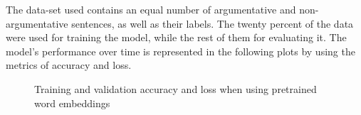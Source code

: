 The data-set used contains an equal number of argumentative and non-argumentative sentences, as well as their labels. The twenty percent of the data were used for training the model, while the rest of them for evaluating it. The model's performance over time is represented in the following plots by using the metrics of accuracy and loss. 

\begin{figure}[H]
	\centering
	\qquad
	\caption{
		Training and validation accuracy and loss when using pretrained word embeddings
	}
	\label{fig:example}
\end{figure}

